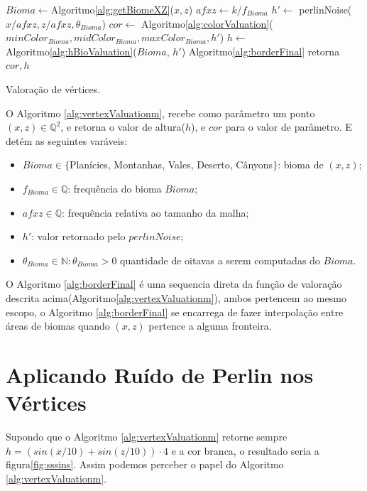 \begin{algorithm}[H]\label{alg:vertexValuationm}%
    $Bioma \leftarrow $Algoritmo\ref{alg:getBiomeXZ}($x, z$)\;
    $afxz \leftarrow k/f_{Bioma}$\;
    $h' \leftarrow$ perlinNoise($x/afxz, z/afxz, \theta_{Bioma}$)\;
    $cor \leftarrow$ Algoritmo\ref{alg:colorValuation}($minColor_{Bioma}, midColor_{Bioma}, maxColor_{Bioma}, h'$)\;
    $h \leftarrow$ Algoritmo\ref{alg:hBioValuation}($Bioma$, $h'$)\;
    Algoritmo\ref{alg:borderFinal}\;
    retorna $cor, h$\;
    \caption{Valoração de vértices.}
\end{algorithm}
O Algoritmo \ref{alg:vertexValuationm}, recebe como parâmetro um
ponto $(x, z) \in \mathbb{Q}^{2}$, e retorna o valor de altura($h$), e $cor$ para o valor de parâmetro.
E detém as seguintes varáveis:
\begin{itemize}
    \item $Bioma \in \{$Planícies, Montanhas, Vales, Deserto, Cânyons$\}$: bioma de $(x, z)$;
    \item $f_{Bioma} \in \mathbb{Q}$: frequência do bioma $Bioma$;
    \item $afxz \in \mathbb{Q}$: frequência relativa ao tamanho da malha;
    \item $h'$: valor retornado pelo $perlinNoise$;
    \item $\theta_{Bioma} \in \mathbb{N}: \theta_{Bioma} > 0$ quantidade de oitavas a serem computadas do $Bioma$.
\end{itemize}


O Algoritmo \ref{alg:borderFinal} é uma sequencia direta da função de valoração 
descrita acima(Algoritmo\ref{alg:vertexValuationm}), ambos pertencem ao mesmo escopo, o Algoritmo \ref{alg:borderFinal}
se encarrega de fazer interpolação entre áreas de biomas quando $(x, z)$ pertence
a alguma fronteira.

\section{Aplicando Ruído de Perlin nos Vértices}
Supondo que o Algoritmo \ref{alg:vertexValuationm} retorne sempre $h = (sin(x/10) + sin(z/10)) \cdot 4$ e 
a cor branca, o resultado seria a figura\ref{fig:sssins}. Assim podemos perceber o papel do Algoritmo \ref{alg:vertexValuationm}.

